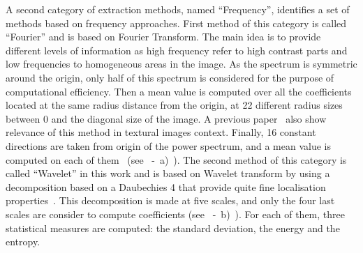 \documentclass[journal,article,submit,moreauthors,pdftex, applsci]{Definitions/mdpi}
\begin{document}
A second category of extraction methods, named “Frequency”, identifies a set of methods based on frequency approaches. First method of this category is called “Fourier” and is based on Fourier Transform. The main idea is to provide different levels of information as high frequency refer to high contrast parts and low frequencies to homogeneous areas in the image. As the spectrum is symmetric around the origin, only half of this spectrum is considered for the purpose of computational efficiency. Then a mean value is computed over all the coefficients located at the same radius distance from the origin, at 22 different radius sizes between 0 and the diagonal size of the image. A previous paper~\cite{Smach2008a} also show relevance of this method in textural images context. Finally, 16 constant directions are taken from origin of the power spectrum, and a mean value is computed on each of them~\cite{Wiltgen2008} (see ~-~a)~). The second method of this category is called “Wavelet” in this work and is based on Wavelet transform by using a decomposition based on a Daubechies 4 that provide quite fine localisation properties~\cite{Wiltgen2008}. This decomposition is made at five scales, and only the four last scales are consider to compute coefficients  (see  ~-~b)~). For each of them, three statistical measures are computed: the standard deviation, the energy and the entropy.\par
\end{document}
